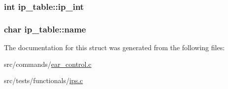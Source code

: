 \subsubsection[{\texorpdfstring{ip\+\_\+int}{ip_int}}]{\setlength{\rightskip}{0pt plus 5cm}int ip\+\_\+table\+::ip\+\_\+int}\hypertarget{structip__table_a164501eaaa381a490d1b477b6202a3f4}{}\label{structip__table_a164501eaaa381a490d1b477b6202a3f4}
\subsubsection[{\texorpdfstring{name}{name}}]{\setlength{\rightskip}{0pt plus 5cm}char ip\+\_\+table\+::name}\hypertarget{structip__table_af74e25ef3abad1b79ca32e25cd0e1ca3}{}\label{structip__table_af74e25ef3abad1b79ca32e25cd0e1ca3}


The documentation for this struct was generated from the following files\+:\begin{DoxyCompactItemize}
\item 
src/commands/\hyperlink{commands_2ear__control_8c}{ear\+\_\+control.\+c}\item 
src/tests/functionals/\hyperlink{ips_8c}{ips.\+c}\end{DoxyCompactItemize}
